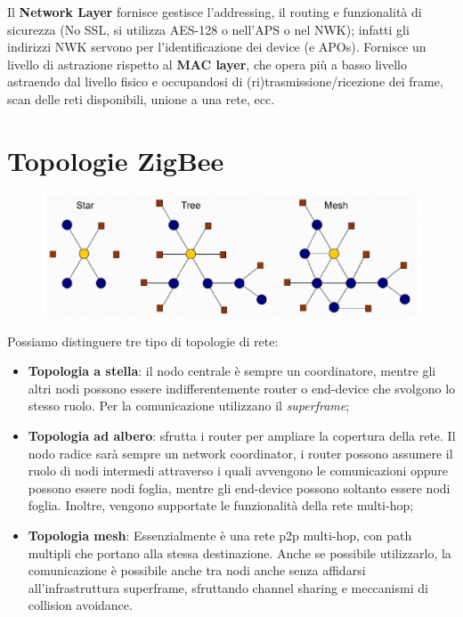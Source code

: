 Il \textbf{Network Layer} fornisce gestisce l'addressing, il routing e funzionalità di sicurezza (No SSL, si utilizza AES-128 o nell'APS o nel NWK); infatti gli indirizzi NWK servono per l'identificazione dei device (e APOs).
Fornisce un livello di astrazione rispetto al \textbf{MAC layer}, che opera più a basso livello astraendo dal livello fisico e occupandosi di (ri)trasmissione/ricezione dei frame, scan delle reti disponibili, unione a una rete, ecc.

\section{Topologie ZigBee}

\begin{figure}[htbp]
   \centering
   \includegraphics{images/questions/Schermata del 2023-10-19 15-34-16.png}
   \label{fig:dom8}
\end{figure}

Possiamo distinguere tre tipo di topologie di rete:

\begin{itemize}
\item \textbf{Topologia a stella}: il nodo centrale è sempre un coordinatore, mentre gli altri nodi possono essere indifferentemente router o end-device che svolgono lo stesso ruolo. Per la comunicazione utilizzano il \emph{superframe};
\item \textbf{Topologia ad albero}: sfrutta i router per ampliare la copertura della rete. Il nodo radice sarà sempre un network coordinator, i router possono assumere il ruolo di nodi intermedi attraverso i quali avvengono le comunicazioni oppure possono essere nodi foglia, mentre gli end-device possono soltanto essere nodi foglia. Inoltre, vengono supportate le funzionalità della rete multi-hop;
\item \textbf{Topologia mesh}: Essenzialmente è una rete p2p multi-hop, con path multipli che portano alla stessa destinazione.
Anche se possibile utilizzarlo, la comunicazione è possibile anche tra nodi anche senza affidarsi all'infrastruttura superframe, sfruttando channel sharing e meccanismi di collision avoidance.
\end{itemize}

